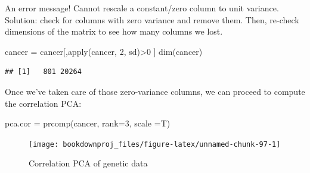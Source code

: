 \documentclass[
]{article}
\newenvironment{Shaded}{\begin{snugshade}}{\end{snugshade}}
\newcommand{\AttributeTok}[1]{\textcolor[rgb]{0.77,0.63,0.00}{#1}}
\newcommand{\DecValTok}[1]{\textcolor[rgb]{0.00,0.00,0.81}{#1}}
\newcommand{\FunctionTok}[1]{\textcolor[rgb]{0.00,0.00,0.00}{#1}}
\newcommand{\NormalTok}[1]{#1}
\newcommand{\OtherTok}[1]{\textcolor[rgb]{0.56,0.35,0.01}{#1}}
\newcommand{\SpecialCharTok}[1]{\textcolor[rgb]{0.00,0.00,0.00}{#1}}
\newcommand{\StringTok}[1]{\textcolor[rgb]{0.31,0.60,0.02}{#1}}
\theoremstyle{definition}
\theoremstyle{definition}
\theoremstyle{definition}
\theoremstyle{definition}
\theoremstyle{remark}
\begin{document}
An error message! Cannot rescale a constant/zero column to unit variance. Solution: check for columns with zero variance and remove them. Then, re-check dimensions of the matrix to see how many columns we lost.

\begin{Shaded}
\begin{Highlighting}[]
\NormalTok{cancer }\OtherTok{=}\NormalTok{ cancer[,}\FunctionTok{apply}\NormalTok{(cancer, }\DecValTok{2}\NormalTok{, sd)}\SpecialCharTok{\textgreater{}}\DecValTok{0}\NormalTok{ ]}
\FunctionTok{dim}\NormalTok{(cancer)}
\end{Highlighting}
\end{Shaded}

\begin{verbatim}
## [1]   801 20264
\end{verbatim}

Once we've taken care of those zero-variance columns, we can proceed to compute the correlation PCA:

\begin{Shaded}
\begin{Highlighting}[]
\NormalTok{pca.cor }\OtherTok{=} \FunctionTok{prcomp}\NormalTok{(cancer, }\AttributeTok{rank=}\DecValTok{3}\NormalTok{, }\AttributeTok{scale =}\NormalTok{T)}
\end{Highlighting}
\end{Shaded}

\begin{Shaded}
\end{Shaded}

\begin{figure}

{\centering \texttt{[image: bookdownproj\_files/figure-latex/unnamed-chunk-97-1]} 

}

\caption{Correlation PCA of genetic data}\label{fig:unnamed-chunk-97}
\end{figure}
\end{document}
